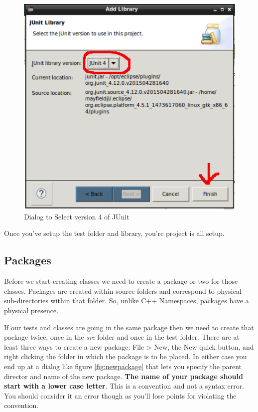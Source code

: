 \documentclass[]{tufte-handout}
\begin{document}
\vspace{.1in}
\begin{center}
\begin{figure}[!htb]
\includegraphics[scale=.5]{Eclipse-SelectJUnit4.png}
\caption{Dialog to Select version 4 of JUnit }
\label{fig:SelectJUnit4} 
\end{figure}
\end{center}
\vspace{.1in}

Once you've setup the test folder and library, you're project is all setup. 

\subsection{Packages}

Before we start creating classes we need to create a package or two for those classes. Packages are created within source folders and correspond to physical sub-directories within that folder. So, unlike C++ Namespaces, packages have a physical presence. 

If our tests and classes are going in the same package then we need to create that package twice, once in the \textit{src} folder and once in the test folder. There are at least three ways to create a new package: File > New, the New quick button, and right clicking the folder in which the package is to be placed. In either case you end up at a dialog like figure \ref{fig:newpackage} that lets you specify the parent director and name of the new package. \textbf{The name of your package should start with a lower case letter}. This is a convention and not a syntax error.  You should consider it an error though as you'll lose points for violating the convention. 
\end{document}
